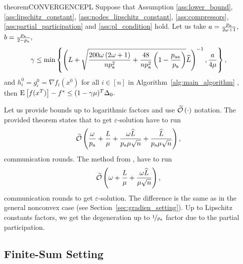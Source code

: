 \documentclass{article}
\newcommand{\algorithmname}{DASHA-PP}
\newcommand*{\probavailable}{\ensuremath{p_{\textnormal{a}}}}
\newcommand*{\probpairaa}{\ensuremath{p_{\textnormal{aa}}}}
\begin{document}
\begin{restatable}{theorem}{CONVERGENCEPL}
  \label{theorem:gradient_oracle_pl}
  Suppose that Assumption \ref{ass:lower_bound}, \ref{ass:lipschitz_constant}, \ref{ass:nodes_lipschitz_constant}, \ref{ass:compressors}, \ref{ass:partial_participation} and \ref{ass:pl_condition} hold. Let us take $a = \frac{\probavailable}{2 \omega + 1},$ $b = \frac{\probavailable}{2 - \probavailable},$ 
  $$\gamma \leq \min\left\{\left(L + \sqrt{\frac{200 \omega \left(2 \omega + 1\right)}{n \probavailable^2} + \frac{48}{n \probavailable^2}\left(1 - \frac{\probpairaa}{\probavailable}\right)}\widehat{L}\right)^{-1}, \frac{a}{4\mu}\right\}, $$ 
  and $h^{0}_i = g^{0}_i = \nabla f_i(x^0)$ for all $i \in [n]$ in Algorithm~\ref{alg:main_algorithm} \algname{(\algorithmname)},
  then ${\rm E}\left[f(x^{T})\right] - f^* \leq (1 - \gamma \mu)^{T} \Delta_0.$
\end{restatable}

Let us provide bounds up to logarithmic factors and use $\widetilde{\mathcal{O}}\left(\cdot\right)$ notation. The provided theorem states that to get $\varepsilon$-solution \algname{\algorithmname} have to run
\begin{align*}
  \widetilde{\cO}\left(\frac{\omega}{\probavailable} + \frac{L}{\mu} + \frac{\omega \widehat{L}}{\probavailable \mu \sqrt{n}} + \frac{\widehat{L}}{\probavailable \mu \sqrt{n}}\right),
\end{align*}
communication rounds. The method  from \citep{tyurin2022dasha}, have to run
\begin{align*}
  \widetilde{\mathcal{O}}\left(\omega + \frac{L}{\mu} + \frac{\omega \widehat{L}}{\mu \sqrt{n}}\right),
\end{align*}
communication rounds to get $\varepsilon$-solution. The difference is the same as in the general nonconvex case (see Section~\ref{sec:gradien_setting}). Up to Lipschitz constants factors, we get the degeneration up to $\nicefrac{1}{\probavailable}$ factor due to the partial participation.

\subsection{Finite-Sum Setting}
\end{document}
